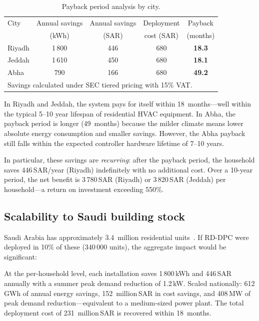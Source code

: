 \documentclass[12pt]{article}
\theoremstyle{plain}
\theoremstyle{definition}
\begin{document}
\begin{table}[H]
\centering
\caption{Payback period analysis by city.}\label{tab:payback}
\begin{tabular*}{\textwidth}{@{\extracolsep{\fill}}lcccc}
\toprule
City & Annual savings & Annual savings & Deployment & Payback \\
 & (kWh) & (SAR) & cost (SAR) & (months) \\
\midrule
Riyadh & 1\,800 & 446 & 680 & \textbf{18.3} \\
Jeddah & 1\,610 & 450 & 680 & \textbf{18.1} \\
Abha & 790 & 166 & 680 & \textbf{49.2} \\
\midrule
\multicolumn{5}{l}{\footnotesize Savings calculated under SEC tiered pricing with 15\% VAT.} \\
\bottomrule
\end{tabular*}
\end{table}

In Riyadh and Jeddah, the system pays for itself within 18~months---well within the typical 5--10 year lifespan of residential HVAC equipment. In Abha, the payback period is longer (49~months) because the milder climate means lower absolute energy consumption and smaller savings. However, the Abha payback still falls within the expected controller hardware lifetime of 7--10 years.

In particular, these savings are \emph{recurring}: after the payback period, the household saves 446\,SAR/year (Riyadh) indefinitely with no additional cost. Over a 10-year period, the net benefit is 3\,780\,SAR (Riyadh) or 3\,820\,SAR (Jeddah) per household---a return on investment exceeding 550\%.

\subsection{Scalability to Saudi building stock}

Saudi Arabia has approximately 3.4~million residential units~\cite{sec2025}. If RD-DPC were deployed in 10\% of these (340\,000 units), the aggregate impact would be significant:

At the per-household level, each installation saves 1\,800\,kWh and 446\,SAR annually with a summer peak demand reduction of 1.2\,kW. Scaled nationally: 612\,GWh of annual energy savings, 152~million\,SAR in cost savings, and 408\,MW of peak demand reduction---equivalent to a medium-sized power plant. The total deployment cost of 231~million\,SAR is recovered within 18~months.
\end{document}
